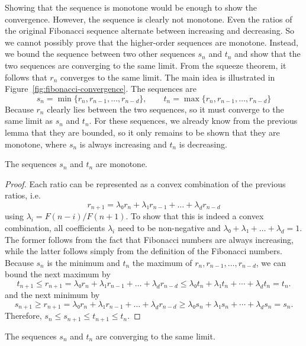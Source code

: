 Showing that the sequence is monotone would be enough to show the convergence.
However, the sequence is clearly not monotone.
Even the ratios of the original Fibonacci sequence alternate between increasing
and decreasing.
So we cannot possibly prove that the higher-order sequences are monotone.
Instead, we bound the sequence between two other sequences $s_n$ and $t_n$
and show that the two sequences are converging to the same limit.
From the squeeze theorem, it follows that $r_n$ converges to the same limit.
The main idea is illustrated in Figure~\ref{fig:fibonacci-convergence}.
The sequences are
\[
  s_n = \min\{r_n, r_{n-1}, …, r_{n-d} \}, \qquad t_n = \max\{r_n, r_{n-1}, …, r_{n-d}\}
\]
Because $r_n$ clearly lies between the two sequences, so it must converge to the same limit as $s_n$ and $t_n$.
For these sequences, we already know from the previous lemma that they are bounded,
so it only remains to be shown that they are monotone,
where $s_n$ is always increasing and $t_n$ is decreasing.

\begin{lemma}
  The sequences $s_n$ and $t_n$ are monotone.
\end{lemma}

\begin{proof}
  Each ratio can be represented as a convex combination of the previous ratios, i.e.
  \[
    r_{n+1} = λ₀ r_n + λ₁ r_{n-1} + \dots + λ_d r_{n-d}
  \]
  using $λ_i = F(n - i) / F(n + 1)$.
  To show that this is indeed a convex combination, all coefficients $λ_i$
  need to be non-negative and $λ₀ + λ₁ + \dots + \lambda_d = 1$.
  The former follows from the fact that Fibonacci numbers are always increasing,
  while the latter follows simply from the definition of the Fibonacci numbers.
  Because $s_n$ is the minimum and $t_n$ the maximum of $r_n, r_{n-1}, …, r_{n-d}$,
  we can bound the next maximum by
  \[
    t_{n+1} ≤ r_{n+1} = λ₀ r_n + λ₁ r_{n-1} + \dots + λ_d r_{n-d} ≤ λ₀ t_n + λ₁ t_n + ⋯ + λ_d t_n = t_n.
  \]
  and the next minimum by
  \[
    s_{n+1} ≥ r_{n+1} = λ₀ r_n + λ₁ r_{n-1} + \dots + λ_d r_{n-d} ≥ λ₀ s_n + λ₁ s_n + ⋯ + λ_d s_n = s_n.
  \]
  Therefore, $s_n ≤ s_{n+1} ≤ t_{n+1} ≤ t_n$.
\end{proof}

\begin{lemma}
  The sequences $s_n$ and $t_n$ are converging to the same limit.
\end{lemma}

